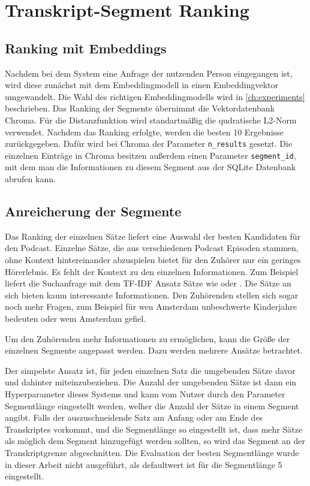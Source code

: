 \section{Transkript-Segment Ranking}

\subsection{Ranking mit Embeddings}

Nachdem bei dem System eine Anfrage der nutzenden Person eingegangen ist, wird diese zunächst mit dem Embeddingmodell in einen Embeddingvektor umgewandelt. 
Die Wahl des richtigen Embeddingmodells wird in \autoref{ch:experiments} beschrieben.
Das Ranking der Segmente übernimmt die Vektordatenbank Chroma.
Für die Distanzfunktion wird standartmäßig die qudratische L2-Norm verwendet.
Nachdem das Ranking erfolgte, werden die besten 10 Ergebnisse zurückgegeben.
Dafür wird bei Chroma der Parameter \verb|n_results| gesetzt.
Die einzelnen Einträge in Chroma besitzen außerdem einen Parameter \verb|segment_id|, mit dem man die Informationen zu diesem Segment aus der SQLite Datenbank abrufen kann.


\subsection{Anreicherung der Segmente}

Das Ranking der einzelnen Sätze liefert eine Auswahl der besten Kandidaten für den Podcast.
Einzelne Sätze, die aus verschiedenen Podcast Episoden stammen, ohne Kontext hintereinander abzuspielen bietet für den Zuhörer nur ein geringes Hörerlebnis. 
Es fehlt der Kontext zu den einzelnen Informationen.
Zum Beispiel liefert die Suchanfrage  mit dem TF-IDF Ansatz Sätze wie  oder .
Die Sätze an sich bieten kaum interessante Informationen.
Den Zuhörenden stellen sich sogar noch mehr Fragen, zum Beispiel für wen Amsterdam unbeschwerte Kinderjahre bedeuten oder wem Amsterdam gefiel.

Um den Zuhörenden mehr Informationen zu ermöglichen, kann die Größe der einzelnen Segmente angepasst werden.
Dazu werden mehrere Ansätze betrachtet.

Der simpelste Ansatz ist, für jeden einzelnen Satz die umgebenden Sätze davor und dahinter miteinzubeziehen.
Die Anzahl der umgebenden Sätze ist dann ein Hyperparameter dieses Systems und kann vom Nutzer durch den Parameter Segmentlänge eingestellt werden, welher die Anzahl der Sätze in einem Segment angibt.
Falls der auszuschneidende Satz am Anfang oder am Ende des Transkriptes vorkommt, und die Segmentlänge so eingestellt ist, dass mehr Sätze als möglich dem Segment hinzugefügt werden sollten, so wird das Segment an der Transkriptgrenze abgeschnitten.
Die Evaluation der besten Segmentlänge wurde in dieser Arbeit nicht ausgeführt, als defaultwert ist für die Segmentlänge 5 eingestellt.

